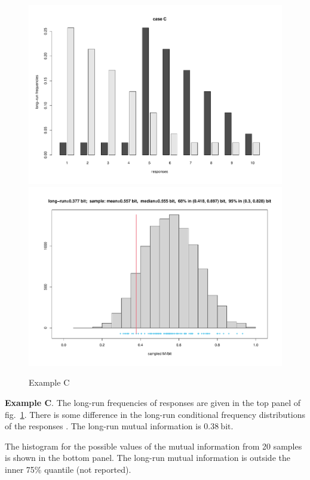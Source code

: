 \documentclass[\ifafour a4paper,12pt,\else a5paper,10pt,\fi%
onecolumn,oneside,article,%
british%
]{memoir}
\theoremstyle{remark}
\theoremstyle{innote}
\renewcommand*{\|}[1][]{\nonscript\,#1\vert\nonscript\;\mathopen{}}
\newcommand*{\fig}{fig.}%
\newcommand*{\bit}{\mathrm{bit}}
\begin{document}
\clearpage

\begin{figure}[p]%
\centering\includegraphics[width=\linewidth]{scripts/resp_caseC.pdf}\\%
\includegraphics[width=\linewidth]{scripts/histo_caseC.pdf}\\
\caption{Example C}\label{fig:resp_caseC}
\end{figure}%
\textbf{Example C}. The long-run frequencies of responses are given in the top
panel of \fig~\ref{fig:resp_caseC}. There is some difference in the
long-run conditional frequency distributions of the responses . The
long-run mutual information is $0.38\:\bit$.

The histogram for the possible values of the mutual information from 20
samples is shown in the bottom panel. The long-run mutual information is
outside the inner 75\% quantile (not reported).
\end{document}
